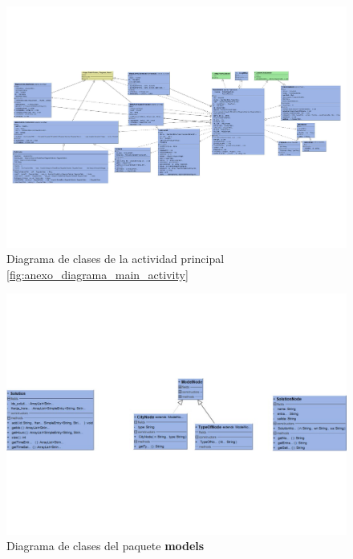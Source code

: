 \begin{figure}[H]
	\centering
	\label{fig:main_activity_diagram}
	\includegraphics[scale=.8,angle=90]{imagenes/main_activity_class_diagram.pdf}
	\caption{Diagrama de clases de la actividad principal \ref{fig:anexo_diagrama_main_activity} }
\end{figure}
\begin{figure}[H]
	\centering
	\label{fig:models_diagram}
	\includegraphics[scale=0.8,angle=90]{imagenes/models_package.pdf}
	\caption{Diagrama de clases del paquete \textbf{models}}
\end{figure}

